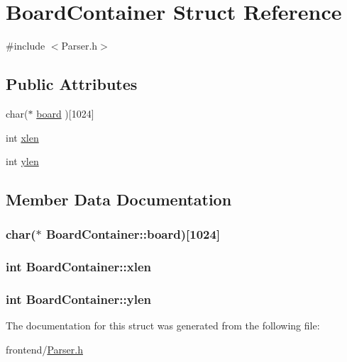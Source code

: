 \hypertarget{structBoardContainer}{\section{Board\-Container Struct Reference}
\label{structBoardContainer}
}


{\ttfamily \#include $<$Parser.\-h$>$}

\subsection*{Public Attributes}
\begin{DoxyCompactItemize}
\item 
char($\ast$ \hyperlink{structBoardContainer_ac48c8d00315c6ba23b92c49a555bc340}{board} )\mbox{[}1024\mbox{]}
\item 
int \hyperlink{structBoardContainer_a8c8f5a08f1a20aa38da2e69d0fdef48b}{xlen}
\item 
int \hyperlink{structBoardContainer_ac438366505cda656d08223d5378caa8f}{ylen}
\end{DoxyCompactItemize}


\subsection{Member Data Documentation}
\hypertarget{structBoardContainer_ac48c8d00315c6ba23b92c49a555bc340}{
\subsubsection[{board}]{\setlength{\rightskip}{0pt plus 5cm}char($\ast$ Board\-Container\-::board)\mbox{[}1024\mbox{]}}}\label{structBoardContainer_ac48c8d00315c6ba23b92c49a555bc340}
\hypertarget{structBoardContainer_a8c8f5a08f1a20aa38da2e69d0fdef48b}{
\subsubsection[{xlen}]{\setlength{\rightskip}{0pt plus 5cm}int Board\-Container\-::xlen}}\label{structBoardContainer_a8c8f5a08f1a20aa38da2e69d0fdef48b}
\hypertarget{structBoardContainer_ac438366505cda656d08223d5378caa8f}{
\subsubsection[{ylen}]{\setlength{\rightskip}{0pt plus 5cm}int Board\-Container\-::ylen}}\label{structBoardContainer_ac438366505cda656d08223d5378caa8f}


The documentation for this struct was generated from the following file\-:\begin{DoxyCompactItemize}
\item 
frontend/\hyperlink{Parser_8h}{Parser.\-h}\end{DoxyCompactItemize}
